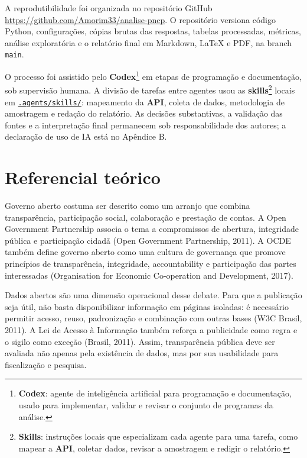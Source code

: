 \documentclass[12pt]{article}
\begin{document}
A reprodutibilidade foi organizada no repositório GitHub
\url{https://github.com/Amorim33/analise-pncp}. O repositório versiona
código Python, configurações, cópias brutas das respostas, tabelas
processadas, métricas, análise exploratória e o relatório final em
Markdown, LaTeX e PDF, na branch \texttt{main}.

O processo foi assistido pelo \textbf{Codex}\footnote{\textbf{Codex}:
  agente de inteligência artificial para programação e documentação,
  usado para implementar, validar e revisar o conjunto de programas da
  análise.} em etapas de programação e documentação, sob supervisão
humana. A divisão de tarefas entre agentes usou as
\textbf{skills}\footnote{\textbf{Skills}: instruções locais que
  especializam cada agente para uma tarefa, como mapear a \textbf{API},
  coletar dados, revisar a amostragem e redigir o relatório.} locais em
\href{https://github.com/Amorim33/analise-pncp/tree/main/.agents/skills}{\texttt{.agents/skills/}}:
mapeamento da \textbf{API}, coleta de dados, metodologia de amostragem e
redação do relatório. As decisões substantivas, a validação das fontes e
a interpretação final permanecem sob responsabilidade dos autores; a
declaração de uso de IA está no Apêndice B.

\section{Referencial teórico}\label{referencial-teuxf3rico}

Governo aberto costuma ser descrito como um arranjo que combina
transparência, participação social, colaboração e prestação de contas. A
Open Government Partnership associa o tema a compromissos de abertura,
integridade pública e participação cidadã (Open Government Partnership,
2011). A OCDE também define governo aberto como uma cultura de
governança que promove princípios de transparência, integridade,
accountability e participação das partes interessadas (Organisation for
Economic Co-operation and Development, 2017).

Dados abertos são uma dimensão operacional desse debate. Para que a
publicação seja útil, não basta disponibilizar informação em páginas
isoladas: é necessário permitir acesso, reuso, padronização e combinação
com outras bases (W3C Brasil, 2011). A Lei de Acesso à Informação também
reforça a publicidade como regra e o sigilo como exceção (Brasil, 2011).
Assim, transparência pública deve ser avaliada não apenas pela
existência de dados, mas por sua usabilidade para fiscalização e
pesquisa.
\end{document}
